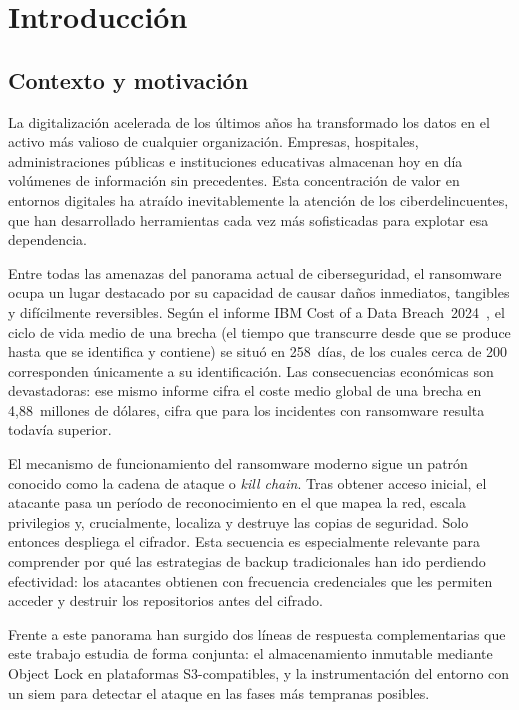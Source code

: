 \documentclass[../main.tex]{subfiles}
\begin{document}
\chapter{Introducción}
\label{C:introduccion}

\section{Contexto y motivación}

La digitalización acelerada de los últimos años ha transformado los datos
en el activo más valioso de cualquier organización. Empresas, hospitales,
administraciones públicas e instituciones educativas almacenan hoy en día
volúmenes de información sin precedentes. Esta concentración de valor en
entornos digitales ha atraído inevitablemente la atención de los
ciberdelincuentes, que han desarrollado herramientas cada vez más
sofisticadas para explotar esa dependencia.

Entre todas las amenazas del panorama actual de ciberseguridad, el
ransomware ocupa un lugar destacado por su capacidad de causar daños
inmediatos, tangibles y difícilmente reversibles. Según el informe
IBM Cost of a Data Breach~2024~\cite{ibmcost2024}, el ciclo de vida medio
de una brecha (el tiempo que transcurre desde que se produce hasta que
se identifica y contiene) se situó en 258~días, de los cuales cerca de
200 corresponden únicamente a su identificación. Las consecuencias
económicas son devastadoras: ese mismo informe cifra el coste medio global
de una brecha en 4,88~millones de dólares, cifra que para los incidentes
con ransomware resulta todavía superior.

El mecanismo de funcionamiento del ransomware moderno sigue un patrón
conocido como la cadena de ataque o \textit{kill chain}. Tras obtener
acceso inicial, el atacante pasa un período de reconocimiento en el que
mapea la red, escala privilegios y, crucialmente, localiza y destruye las
copias de seguridad. Solo entonces despliega el cifrador. Esta secuencia
es especialmente relevante para comprender por qué las estrategias de
backup tradicionales han ido perdiendo efectividad: los atacantes obtienen
con frecuencia credenciales que les permiten acceder y destruir los
repositorios antes del cifrado.

Frente a este panorama han surgido dos líneas de respuesta complementarias
que este trabajo estudia de forma conjunta: el almacenamiento inmutable
mediante Object Lock en plataformas S3-compatibles, y la instrumentación
del entorno con un \gls{siem} para detectar el ataque en las fases más
tempranas posibles.
\end{document}
